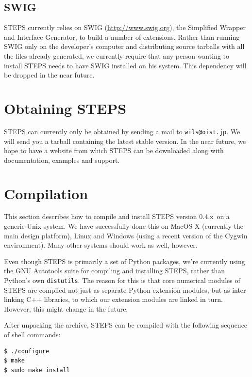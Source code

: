 \documentclass[a4paper,12pt]{book}
\newcommand{\stepsversion}[0]{0.4}
\newcommand{\stepsversionseries}[0]{\stepsversion.x}
\begin{document}
\subsection{SWIG}

STEPS currently relies on SWIG (\url{http://www.swig.org}), the Simplified Wrapper and Interface Generator, to build a number of extensions. Rather than running SWIG only on the developer's computer and distributing source tarballs with all the files already generated, we currently require that any person wanting to install STEPS needs to have SWIG installed on his system. This dependency will be dropped in the near future.

\section{Obtaining STEPS}

STEPS can currently only be obtained by sending a mail to \texttt{wils@oist.jp}. We will send you a tarball containing the latest stable version. In the near future, we hope to have a website from which STEPS can be downloaded along with documentation, examples and support.

\section{Compilation}

This section describes how to compile and install STEPS version \stepsversionseries\ on a generic Unix system. We have successfully done this on MacOS X (currently the main design platform), Linux and Windows (using a recent version of the Cygwin environment). Many other systems should work as well, however.

Even though STEPS is primarily a set of Python packages, we're currently using the GNU Autotools suite for compiling and installing STEPS, rather than Python's own \texttt{distutils}. The reason for this is that core numerical modules of STEPS are compiled not just as separate Python extension modules, but as inter-linking C++ libraries, to which our extension modules are linked in turn. However, this might change in the future.

After unpacking the archive, STEPS can be compiled with the following sequence of shell commands:

\begin{verbatim}
$ ./configure
$ make
$ sudo make install
\end{verbatim}
\end{document}
